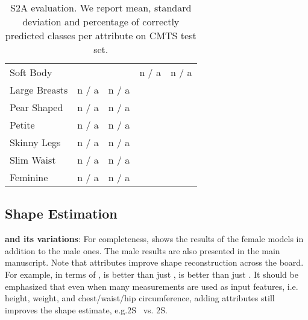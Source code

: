 \documentclass[10pt,twocolumn,letterpaper]{article}
\newcommand{\qheading}[1]{\noindent\textbf{#1}:}
\newcommand{\colorattr}{\color{PineGreen}}
\newcommand{\colorheight}{\color{Bittersweet}}
\newcommand{\colorweight}{\color{Orange}}
\newcommand{\colorcirc}{\color{OrangeRed}}
\newcommand{\colorAHWtoS}{\text{\mbox{{\colorattr{A}}{\colorheight{H}}{\colorweight{W}}2S}}\xspace}
\newcommand{\colorAHtoS}{\text{\mbox{{\colorattr{A}}{\colorheight{H}}2S}}\xspace}
\newcommand{\colorHWtoS}{\text{\mbox{{\colorheight{H}}{\colorweight{W}}2S}}\xspace}
\newcommand{\colorHtoS}{\text{\mbox{{\colorheight{H}}2S}}\xspace}
\newcommand{\AtoS}{\text{\mbox{A2S}}\xspace}
\newcommand{\cmts}{CMTS\xspace}
\newcommand{\vspaceTABaboveCaption}{-0.0 em}
\renewcommand{\ie}{\mbox{i.e.}\xspace}
\renewcommand{\eg}{\mbox{e.g.}\xspace}
\newcommand{\na}{n / a}
\newcommand{\vtovHD}{\mbox{}\xspace}
\begin{document}
\begin{appendices}
\begin{table}[t!]
{\begin{tabular}{lllll}
            Soft Body                  &            &                   & \na             & \na       \\
            Large Breasts              & \na                       & \na                        &  &  \\
            Pear Shaped                & \na                       & \na                        &  &  \\
            Petite                     & \na                       & \na                        &  &  \\
            Skinny Legs                & \na                       & \na                        &  &  \\
            Slim Waist                 & \na                       & \na                        &  &  \\
            Feminine                   & \na                       & \na                        &  &  \\
            \bottomrule
        \end{tabular}
    }
    \vspace{\vspaceTABaboveCaption}
    \caption{S2A evaluation. We report mean, standard deviation and percentage of correctly predicted classes per attribute on \cmts test set.
    }
    \label{tab:s2a_quant_result}
\end{table}
 
\subsection{Shape Estimation}

\qheading{\AtoS and its variations}
For completeness,  shows the results of the female \AtoS models in addition to the male ones. The male results are also presented in the main manuscript.
Note that attributes improve shape reconstruction across the board.
For example, in terms of \vtovHD,
\colorAHtoS
is
better than just
\colorHtoS
,
\colorAHWtoS
is
better than just
\colorHWtoS
.
It should be emphasized that even when many measurements are used as input features,
\ie height, weight, and chest/waist/hip circumference, adding attributes still
improves the shape estimate, \eg \mbox{{\colorheight{H}}{\colorweight{W}}{\colorcirc{C}}2S
} vs. \mbox{{\colorattr{A}}{\colorheight{H}}{\colorweight{W}}{\colorcirc{C}}2S}.


\end{appendices}
\end{document}
